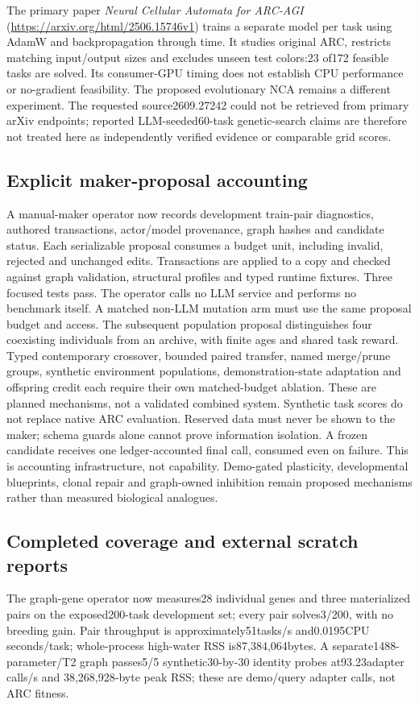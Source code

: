 \documentclass[11pt]{article}
\begin{document}
The primary paper \emph{Neural Cellular Automata for ARC-AGI}
(\url{https://arxiv.org/html/2506.15746v1}) trains a separate model per task
using AdamW and backpropagation through time. It studies original ARC, restricts
matching input/output sizes and excludes unseen test colors:23 of172 feasible
tasks are solved. Its consumer-GPU timing does not establish CPU performance or
no-gradient feasibility. The proposed evolutionary NCA remains a different
experiment. The requested source2609.27242 could not be retrieved from primary
arXiv endpoints; reported LLM-seeded60-task genetic-search claims are therefore
not treated here as independently verified evidence or comparable grid scores.

\subsection{Explicit maker-proposal accounting}
A manual-maker operator now records development train-pair diagnostics, authored
transactions, actor/model provenance, graph hashes and candidate status.
Each serializable proposal consumes a budget unit, including invalid, rejected
and unchanged edits. Transactions are applied to a copy and checked against graph
validation, structural profiles and typed runtime fixtures. Three focused tests
pass. The operator calls no LLM service and performs no benchmark itself.
A matched non-LLM mutation arm must use the same proposal budget and access.
The subsequent population proposal distinguishes four coexisting individuals
from an archive, with finite ages and shared task reward. Typed contemporary
crossover, bounded paired transfer, named merge/prune groups, synthetic environment
populations, demonstration-state adaptation and offspring credit each require
their own matched-budget ablation. These are planned mechanisms, not a validated
combined system. Synthetic task scores do not replace native ARC evaluation.
Reserved data must never be shown to the maker; schema guards alone cannot prove
information isolation. A frozen candidate receives one ledger-accounted final
call, consumed even on failure. This is accounting infrastructure, not capability.
Demo-gated plasticity, developmental blueprints, clonal repair and graph-owned
inhibition remain proposed mechanisms rather than measured biological analogues.

\subsection{Completed coverage and external scratch reports}
The graph-gene operator now measures28 individual genes and three materialized
pairs on the exposed200-task development set; every pair solves3/200, with no
breeding gain. Pair throughput is approximately51tasks/s and0.0195CPU seconds/task;
whole-process high-water RSS is87{,}384{,}064bytes. A separate1488-parameter/T2
graph passes5/5 synthetic30-by-30 identity probes at93.23adapter calls/s and
38{,}268{,}928-byte peak RSS; these are demo/query adapter calls, not ARC fitness.
\end{document}
